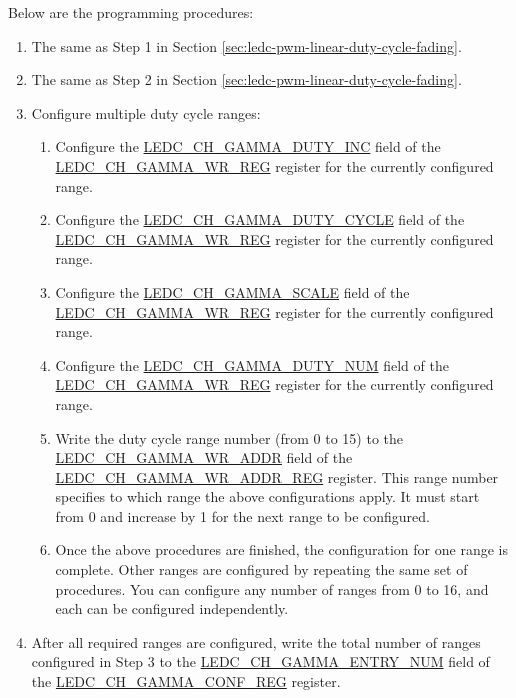 \documentclass[main\_\_EN.tex]{subfiles}
\begin{document}
Below are the programming procedures:

\begin{enumerate}
    \item The same as Step 1 in Section \ref{sec:ledc-pwm-linear-duty-cycle-fading}.
    \item The same as Step 2 in Section \ref{sec:ledc-pwm-linear-duty-cycle-fading}.
    \item Configure multiple duty cycle ranges:
    \begin{enumerate}
        \item Configure the \hyperref[fielddesc:LEDCCHNGAMMADUTYINC]{LEDC\_CH\_GAMMA\_DUTY\_INC} field of the \hyperref[regdesc:LEDCCHNGAMMAWRREG]{LEDC\_CH\_GAMMA\_WR\_REG} register for the currently configured range.
        \item Configure the \hyperref[fielddesc:LEDCCHNGAMMADUTYCYCLE]{LEDC\_CH\_GAMMA\_DUTY\_CYCLE} field of the \hyperref[regdesc:LEDCCHNGAMMAWRREG]{LEDC\_CH\_GAMMA\_WR\_REG} register for the currently configured range.
        \item Configure the \hyperref[fielddesc:LEDCCHNGAMMASCALE]{LEDC\_CH\_GAMMA\_SCALE} field of the \hyperref[regdesc:LEDCCHNGAMMAWRREG]{LEDC\_CH\_GAMMA\_WR\_REG} register for the currently configured range.
        \item Configure the \hyperref[fielddesc:LEDCCHNGAMMADUTYNUM]{LEDC\_CH\_GAMMA\_DUTY\_NUM} field of the \hyperref[regdesc:LEDCCHNGAMMAWRREG]{LEDC\_CH\_GAMMA\_WR\_REG} register for the currently configured range.
        \item Write the duty cycle range number (from 0 to 15) to the \hyperref[regdesc:LEDCCHNGAMMAWRADDRREG]{LEDC\_CH\_GAMMA\_WR\_ADDR} field of the \hyperref[fielddesc:LEDCCHNGAMMAWRADDR]{LEDC\_CH\_GAMMA\_WR\_ADDR\_REG} register. This range number specifies to which range the above configurations apply. It must start from 0 and increase by 1 for the next range to be configured.
        \item Once the above procedures are finished, the configuration for one range is complete. Other ranges are configured by repeating the same set of procedures. You can configure any number of ranges from 0 to 16, and each can be configured independently.
    \end{enumerate}
    \item After all required ranges are configured, write the total number of ranges configured in Step 3 to  the \hyperref[fielddesc:LEDCCHNGAMMAENTRYNUM]{LEDC\_CH\_GAMMA\_ENTRY\_NUM} field of the \hyperref[regdesc:LEDCCHNGAMMACONFREG]{LEDC\_CH\_GAMMA\_CONF\_REG} register.

\end{enumerate}
\end{document}

